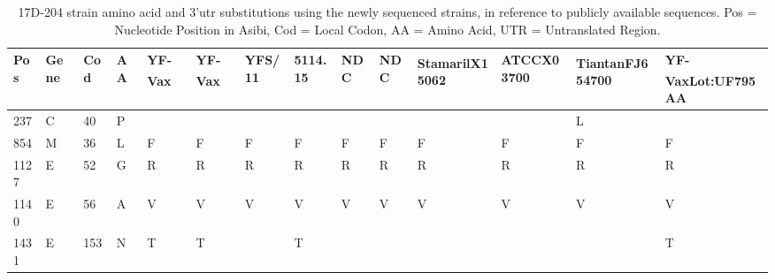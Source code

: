 \footnotesize
\begin{longtabu} to \columnwidth {X[.7,c]X[.7,c]X[.6,c]X[.4,c]X[c]X[c]X[c]X[c]X[.7,c]X[.7,c]X[1.1,c]X[1.1,c]X[1.2,c]X[c]}
	\caption[17D-204 strain amino acid and 3'UTR substitutions using the newly sequenced strains, in reference to publicly available sequences.]{17D-204 strain amino acid and 3'\gls{utr} substitutions using the newly sequenced strains, in reference to publicly available sequences. Pos = Nucleotide Position in Asibi, Cod = Local Codon, AA = Amino Acid, UTR = Untranslated Region.\label{subs_public_17D204}}\\

	\toprule
	\rowfont{\bfseries} Pos & Gene  & Cod & AA & YF-Vax\textsuperscript{\textregistered} & YF-Vax\textsuperscript{\textregistered} & YFS/11 & 5114.15 & NDC & NDC & Stamaril\textsuperscript{\textregistered}\newline X15062 & ATCC\newline X03700 & Tiantan\textsuperscript{\textregistered}\newline FJ654700 & YF-Vax\textsuperscript{\textregistered}\newline Lot:\newline UF795AA \\ \midrule
	\rowfont{\normalfont} 
237      & C     & 40    & P          &              &              &        &         &          &          &                       &                   & L                        &                  \\
854      & M     & 36    & L          & F            & F            & F      & F       & F        & F        & F                     & F                 & F                        & F                \\
1127     & E     & 52    & G          & R            & R            & R      & R       & R        & R        & R                     & R                 & R                        & R                \\
1140     & E     & 56    & A          & V            & V            & V      & V       & V        & V        & V                     & V                 & V                        & V                \\
1431     & E     & 153   & N          & T            & T            &        & T       &          &          &                       &                   &                          & T                \\

\end{longtabu}
